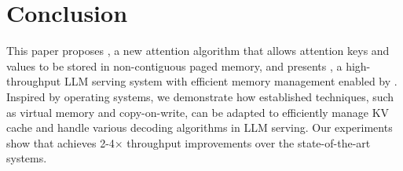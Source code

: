 \section{Conclusion}
This paper proposes \tech, a new attention algorithm that allows attention keys and values to be stored in non-contiguous paged memory, and presents \sys, a high-throughput LLM serving system with efficient memory management enabled by \tech.
Inspired by operating systems, we demonstrate how established techniques, such as virtual memory and copy-on-write, can be adapted to efficiently manage KV cache and handle various decoding algorithms in LLM serving.
Our experiments show that \sys achieves 2-4$\times$ throughput improvements over the state-of-the-art systems.
